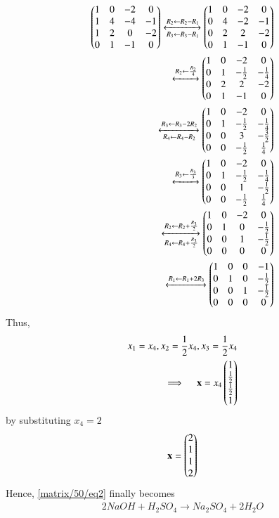 \begin{align}
    \begin{pmatrix}1 & 0 & -2 & 0\\
           1 & 4 & -4 & -1\\
           1 & 2 & 0 & -2\\
           0 & 1 & -1 & 0\end{pmatrix}
    \xleftrightarrow[R_{3}\leftarrow R_3-R_{1}]{R_{2}\leftarrow R_2- R_1}
    \begin{pmatrix}1 & 0 & -2 & 0\\
           0 & 4 & -2 & -1\\
           0 & 2 & 2 & -2\\
           0 & 1 & -1 & 0\end{pmatrix}\\
    \xleftrightarrow{R_2 \leftarrow \frac{R_2}{4}}
    \begin{pmatrix}1 & 0 & -2 & 0\\
          0 & 1 & -\frac{1}{2} & -\frac{1}{4}\\
          0 & 2 & 2 & -2\\
          0 & 1 & -1 & 0\end{pmatrix}\\
    \xleftrightarrow[R_4 \leftarrow R_4 - R_2]{R_3 \leftarrow R_3 - 2R_2}
    \begin{pmatrix}1 & 0 & -2 & 0\\
           0 & 1 & -\frac{1}{2} & -\frac{1}{4}\\
           0 & 0 & 3 & -\frac{3}{2}\\
           0 & 0 & -\frac{1}{2} & \frac{1}{4}\end{pmatrix}\\
    \xleftrightarrow{R_3 \leftarrow \frac{R_3}{3}}
    \begin{pmatrix}1 & 0 & -2 & 0\\
           0 & 1 & -\frac{1}{2} & -\frac{1}{4}\\
           0 & 0 & 1 & -\frac{1}{2}\\
           0 & 0 & -\frac{1}{2} & \frac{1}{4}\end{pmatrix}\\
    \xleftrightarrow[R_{4}\leftarrow R_4+\frac{R_3}{2}]{R_{2}\leftarrow R_2+ \frac{R_3}{2}}
    \begin{pmatrix}1 & 0 & -2 & 0\\
           0 & 1 & 0 & -\frac{1}{2}\\
           0 & 0 & 1 & -\frac{1}{2}\\
           0 & 0 & 0 & 0\end{pmatrix}\\
    \xleftrightarrow{R_1 \leftarrow R_1+2R_3}
    \begin{pmatrix}1 & 0 & 0 & -1\\
           0 & 1 & 0 & -\frac{1}{2}\\
           0 & 0 & 1 & -\frac{1}{2}\\
           0 & 0 & 0 & 0\end{pmatrix}
\end{align}
Thus,
\begin{align}
    x_1=x_4, x_2= \frac{1}{2}x_4, x_3=\frac{1}{2}x_4\\
    \implies \quad\mathbf{x}= x_4\begin{pmatrix}1\\ \frac{1}{2}\\ \frac{1}{2}\\1\end{pmatrix} 
\end{align} 
by substituting $x_4= 2$
\begin{align}
    \mathbf{x}=\begin{pmatrix}2\\1\\1\\2\end{pmatrix}
\end{align}
Hence, \eqref{matrix/50/eq2} finally becomes
\hfill\break
\begin{align}
    2 NaOH + H_2SO_4 \xrightarrow{} 
    Na_2SO_4 + 2 H_2O
\end{align}